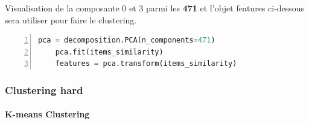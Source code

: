 \begin{figure}[H]
    \centering
    \qquad
\end{figure}

Visualisation de la composante 0 et 3 parmi les \textbf{471} et l’objet \colorbox{gray!30}{features} ci-dessous sera utiliser pour faire le clustering.
\begin{lstlisting}[language=Python,label={pca_code}, basicstyle=\scriptsize, frame=l,framesep=4.5mm,framexleftmargin=2.5mm,tabsize=2,numbers=left,fillcolor=\color{blueforest!70},rulecolor=\color{blueforest},numberstyle=\normalfont\tiny\color{white}]
	pca = decomposition.PCA(n_components=471)
	pca.fit(items_similarity)
	features = pca.transform(items_similarity)
\end{lstlisting}

\subsubsection{Clustering hard}

\paragraph{K-means Clustering}

